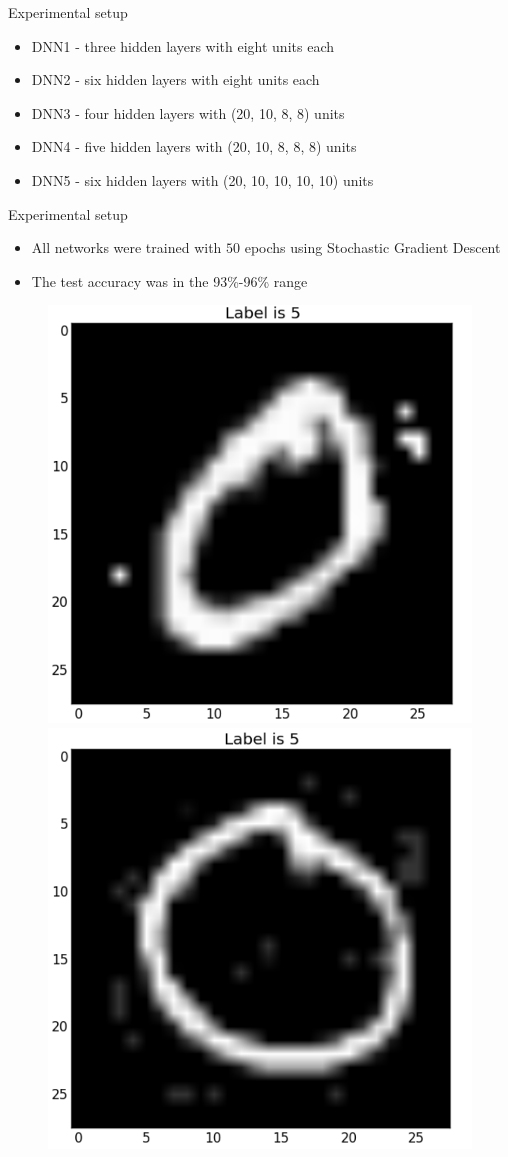 \documentclass{beamer}
\begin{document}
\begin{frame}{Experimental setup}
  \begin{itemize}
  \item DNN1 - three hidden layers with eight units each
  \item DNN2 - six hidden layers with eight units each
  \item DNN3 - four hidden layers with (20, 10, 8, 8) units
  \item DNN4 - five hidden layers with (20, 10, 8, 8, 8) units
  \item DNN5 - six hidden layers with (20, 10, 10, 10, 10) units
  \end{itemize}
\end{frame}

\begin{frame}{Experimental setup}
  \begin{itemize}
  \item All networks were trained with $50$ epochs using Stochastic Gradient Descent
  \item The test accuracy was in the 93\%-96\% range
  \end{itemize}
\end{frame}

\begin{frame}
  \begin{figure}
    \centering
    \includegraphics[width=0.48\columnwidth]{0-free.png}
    \includegraphics[width=0.48\columnwidth]{0-limited.png}
  \end{figure}
\end{frame}
\end{document}
